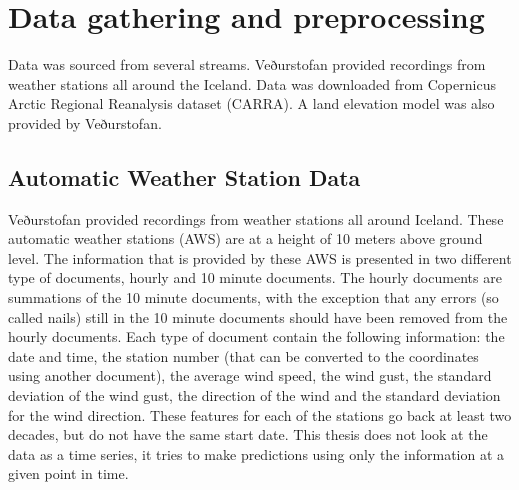 
\chapter{Data gathering and preprocessing} %

\label{Chapter2} %


Data was sourced from several streams. Veðurstofan provided recordings from weather stations all around the Iceland. Data was downloaded from Copernicus Arctic Regional Reanalysis dataset (CARRA). A land elevation model was also provided by Veðurstofan.

\section{Automatic Weather Station Data}

Veðurstofan provided recordings from weather stations all around Iceland. These automatic weather stations (AWS) are at a height of 10 meters above ground level. The information that is provided by these AWS is presented in two different type of documents, hourly and 10 minute documents. The hourly documents are summations of the 10 minute documents, with the exception that any errors (so called nails) still in the 10 minute documents should have been removed from the hourly documents. Each type of document contain the following information: the date and time, the station number (that can be converted to the coordinates using another document), the average wind speed, the wind gust, the standard deviation of the wind gust, the direction of the wind and the standard deviation for the wind direction. These features for each of the stations go back at least two decades, but do not have the same start date. This thesis does not look at the data as a time series, it tries to make predictions using only the information at a given point in time.

